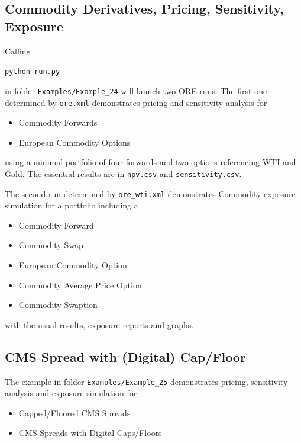 \documentclass[12pt, a4paper]{article}
\begin{document}
\subsection{Commodity Derivatives, Pricing, Sensitivity, Exposure}%
\label{example:24}

Calling

\medskip
\centerline{\tt python run.py}

\medskip
in folder {\tt Examples/Example\_24} will launch two ORE runs. The first one determined by {\tt ore.xml} demonstrates pricing and sensitivity analysis for
\begin{itemize}
\item Commodity Forwards
\item European Commodity Options
\end{itemize}
using a minimal portfolio of four forwards and two options referencing WTI and Gold. 
The essential results are in {\tt npv.csv} and {\tt sensitivity.csv}.

The second run determined by {\tt ore\_wti.xml} demonstrates Commodity exposure simulation for a portfolio including a
\begin{itemize}
\item Commodity Forward
\item Commodity Swap
\item European Commodity Option
\item Commodity Average Price Option
\item Commodity Swaption
\end{itemize}
with the usual results, exposure reports and graphs. 

\subsection{CMS Spread with (Digital) Cap/Floor}%
\label{example:25}

The example in folder {\tt Examples/Example\_25}  demonstrates pricing, sensitivity analysis 
and exposure simulation for 
\begin{itemize}
\item Capped/Floored CMS Spreads
\item CMS Spreads with Digital Caps/Floors
\end{itemize}
\end{document}
